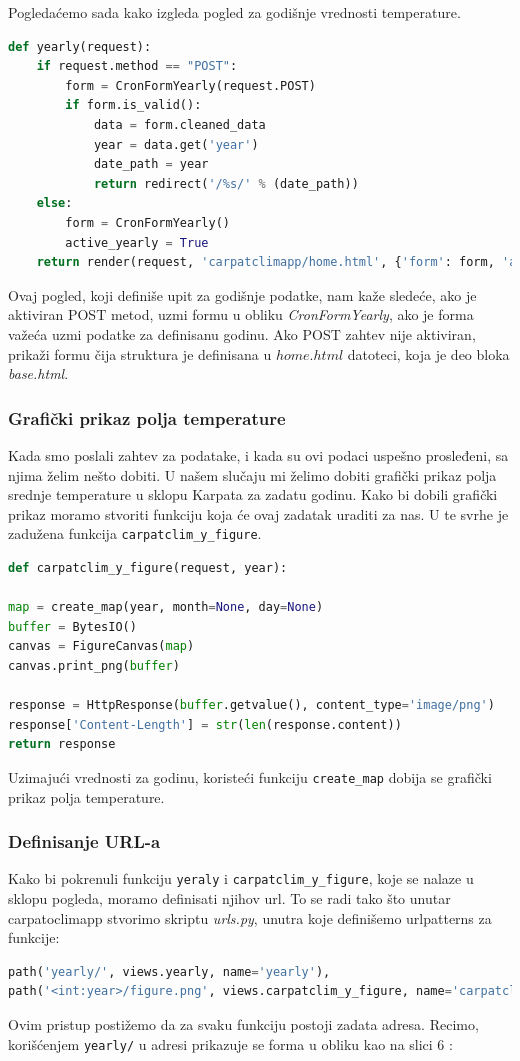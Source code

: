 \documentclass[12pt]{article}
\begin{document}
Pogledaćemo sada kako izgleda pogled za godišnje vrednosti temperature.
\begin{lstlisting}[language=Python]
def yearly(request):
	if request.method == "POST":
		form = CronFormYearly(request.POST)
		if form.is_valid():
			data = form.cleaned_data
			year = data.get('year')
			date_path = year
			return redirect('/%s/' % (date_path))
	else:
		form = CronFormYearly()
		active_yearly = True
	return render(request, 'carpatclimapp/home.html', {'form': form, 'active_yearly': active_yearly})
\end{lstlisting} 
Ovaj pogled, koji definiše upit za godišnje podatke, nam kaže sledeće, ako je aktiviran POST metod, uzmi formu u obliku \textsl{CronFormYearly}, ako je forma važeća uzmi podatke za definisanu godinu. Ako POST zahtev nije aktiviran, prikaži formu čija struktura je definisana u $home.html$ datoteci, koja je deo bloka \textsl{base.html}.

\subsubsection{Grafički prikaz polja temperature}
Kada smo poslali zahtev za podatake, i kada su ovi podaci uspešno prosleđeni, sa njima želim nešto dobiti. U našem slučaju mi želimo dobiti grafički prikaz polja srednje temperature u sklopu Karpata za zadatu godinu. Kako bi dobili grafički prikaz moramo stvoriti funkciju koja će ovaj zadatak uraditi za nas. U te svrhe je zadužena funkcija \verb|carpatclim_y_figure|.
\begin{lstlisting}[language=Python]
def carpatclim_y_figure(request, year):

map = create_map(year, month=None, day=None)
buffer = BytesIO()
canvas = FigureCanvas(map)
canvas.print_png(buffer)

response = HttpResponse(buffer.getvalue(), content_type='image/png')
response['Content-Length'] = str(len(response.content))
return response
\end{lstlisting}
Uzimajući vrednosti za godinu, koristeći funkciju \verb|create_map| dobija se grafički prikaz polja temperature.

\subsubsection{Definisanje URL-a}
Kako bi pokrenuli funkciju \verb|yeraly| i \verb|carpatclim_y_figure|, koje se nalaze u sklopu pogleda, moramo definisati njihov url. To se radi tako što unutar carpatoclimapp stvorimo skriptu \textsl{urls.py}, unutra koje definišemo urlpatterns za funkcije:
\begin{lstlisting}[language=Python]
path('yearly/', views.yearly, name='yearly'),
path('<int:year>/figure.png', views.carpatclim_y_figure, name='carpatclim_y_figure')
\end{lstlisting}
Ovim pristup postižemo da za svaku funkciju postoji zadata adresa. Recimo, korišćenjem \verb|yearly/| u adresi prikazuje se forma u obliku kao na slici 6 :
\end{document}

